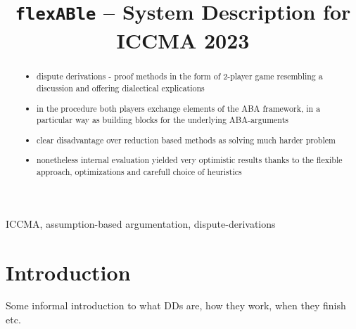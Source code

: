 \documentclass[conference]{IEEEtran}
\newcommand{\flexable}{\texttt{flexABle} \xspace}
\newcommand{\iccma}{ICCMA 2023}
\begin{document}
\title{\flexable -- System Description for \iccma}


\author{
\and    
{}
\and
{}
}

\maketitle


\begin{abstract}
    \begin{itemize}
        \item dispute derivations - proof methods in the form of 2-player game resembling a discussion and offering dialectical explications
        \item in the procedure both players exchange elements of the ABA framework, in a particular way as building blocks for the underlying ABA-arguments
        \item clear disadvantage over reduction based methods as solving much harder problem
        \item nonetheless internal evaluation yielded very optimistic results thanks to the flexible approach, optimizations and carefull choice of heuristics
    \end{itemize}
\end{abstract}

\begin{IEEEkeywords}
ICCMA, assumption-based argumentation, dispute-derivations
\end{IEEEkeywords}

\section{Introduction}
 Some informal introduction to what DDs are, how they work, when they finish etc.
\end{document}
